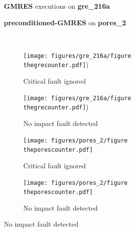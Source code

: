 \documentclass[twoside]{article}
\newcounter{fig}\setcounter{fig}{0}
\begin{document}
  \begin{figure}[H]
    \centering
    
    \begin{minipage}[b]{0.45\linewidth}
      \centering
      \textbf{GMRES} executions on \textbf{gre_216a} 
    \end{minipage}
    \quad
    \begin{minipage}{0.45\linewidth}
      \centering
      \textbf{preconditioned-GMRES} on \textbf{pores_2}
    \end{minipage}\\


    \begin{minipage}[b]{0.48\linewidth}
      
      \begin{subfigure}[t]{\linewidth}
        \centering
        \texttt{[image: figures/gre\_216a/figure\\thegrecounter.pdf]})
        \caption{Critical fault ignored}\label{fig:gre_216a_conv_hist_threshold_3}
      \end{subfigure}
      \quad
      \begin{subfigure}[t]{\linewidth}
        \centering
        \texttt{[image: figures/gre\_216a/figure\\thegrecounter.pdf]})
        \caption{No impact fault detected}\label{fig:gre_216a_conv_hist_threshold_4}
      \end{subfigure}
    \end{minipage}
    \quad
    \begin{minipage}[b]{0.48\linewidth}
      
      \begin{subfigure}[t]{\linewidth}
        \centering
        \texttt{[image: figures/pores\_2/figure\\theporescounter.pdf]}
        \caption{Critical fault ignored}\label{fig:pores_2_conv_hist_threshold_3}
      \end{subfigure}
      \quad
      \begin{subfigure}[t]{\linewidth}
        \centering
        \texttt{[image: figures/pores\_2/figure\\theporescounter.pdf]}
        \caption{No impact fault detected}\label{fig:pores_2_conv_hist_threshold_4}
      \end{subfigure}


\end{minipage}
\end{figure}
\end{document}
